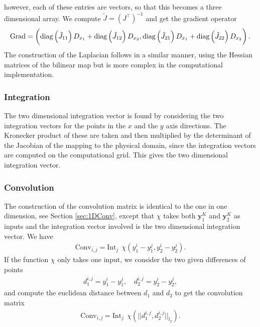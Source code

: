 however, each of these entries are  vectors, so that this becomes a three dimensional array. We compute $\tilde J = \left(J^\top\right)^{-1}$ and get the gradient operator 
\begin{align*}
	\operatorname{Grad} = \left( \text{diag}\left(\tilde J_{11}\right) D_{x_1} + \text{diag}\left(\tilde J_{12}\right) D_{x_2},\text{diag}\left(\tilde J_{21}\right) D_{x_1} + \text{diag}\left(\tilde J_{22}\right) D_{x_2}\right).
\end{align*}
The construction of the Laplacian follows in a similar manner, using the Hessian matrices of the bilinear map but is more complex in the computational implementation.


\subsubsection{Integration}\label{sec:2DQuadInt}
The two dimensional integration vector is found by considering the two integration vectors for the points in the $x$ and the $y$ axis directions. The Kronecker product of these are taken and then multiplied by the determinant of the Jacobian of the mapping to the physical domain, since the integration vectors are computed on the computational grid. This gives the two dimensional integration vector.

\subsubsection{Convolution}\label{sec:2DQuadConv}
The construction of the convolution matrix is identical to the one in one dimension, see Section \ref{sec:1DConv}, except that $\chi$ takes both $\mathbf{y}_1^{K}$ and $\mathbf{y}_2^{K}$ as inputs and the integration vector involved is the two dimensional integration vector.
We have
\begin{align*}
	\text{Conv}_{i,j} = \text{Int}_j \ \ \chi({y}_1^{i} - {y}_1^{j},{y}_2^{i} - {y}_2^{j}).
\end{align*}
If the function $\chi$ only takes one input, we  consider the two given differences of points 
\begin{align*}
	d_1^{i,j} = {y}_1^{i} - {y}_1^{j}, \quad
	d_2^{i,j} = {y}_2^{i} - {y}_2^{j},
\end{align*}
and compute the euclidean distance between $d_1$ and $d_2$ to get the convolution matrix
\begin{align*}
	\text{Conv}_{i,j} = \text{Int}_j \ \ \chi(||d_1^{i,j}, d_2^{i,j}||_{l_2}).
\end{align*}

